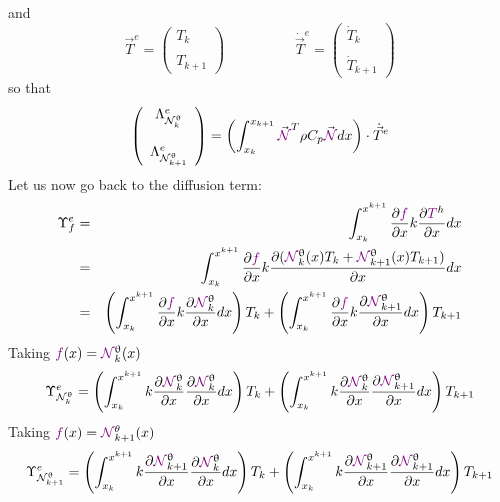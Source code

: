 and 
\[
{\vec T}^e = 
\left(
\begin{array}{c}
T_k \\ \\ T_{k+1}
\end{array}
\right)
\quad
\quad
\quad
\quad
\quad
\dot{\vec T}^e = 
\left(
\begin{array}{c}
\dot{T}_k \\ \\ \dot{T}_{k+1}
\end{array}
\right)
\]
so that 
\[
\left(
\begin{array}{c}
{\Lambda}_{{\mathcal{N}}_k^\uptheta}^e \\  \\ 
{\Lambda}_{{\mathcal{N}}_{k+1}^\uptheta}^e
\end{array}
\right)
=
\left( \int_{x_k}^{x_{k+1}}   
{\vec {\color{violet}{\mathcal{N}}}}^T \rho C_p  {\vec {\color{violet}{\mathcal{N}}}} dx  \right) \cdot \dot{\vec T}^e
\]
Let us now go back to the diffusion term:
\begin{eqnarray}
{\Upsilon}_f^e &=&
\int_{x_k}^{x^{k+1}} \frac{\partial {\color{violet}f}}{\partial x} k 
\frac{\partial {\color{violet}T}^h}{\partial x} dx \nonumber\\
&=&
\int_{x_k}^{x^{k+1}} \frac{\partial {\color{violet}f}}{\partial x} k \frac{\partial  
({\color{violet}{\mathcal{N}}}_{k}^\uptheta(x) T_k 
+ {\color{violet}{\mathcal{N}}}_{k+1}^\uptheta(x) T_{k+1} ) }{\partial x} dx  \nonumber\\
&=&
\left( \int_{x_k}^{x^{k+1}} \frac{\partial {\color{violet}f}}{\partial x}  
k \frac{\partial  {\color{violet}{\mathcal{N}}}_{k}^\uptheta } {\partial x}  dx \right)  T_k 
+ \left( \int_{x_k}^{x^{k+1}} \frac{\partial {\color{violet}f}}{\partial x}  
k \frac{\partial  {\color{violet}{\mathcal{N}}}_{k+1}^\uptheta } {\partial x} dx \right) T_{k+1}  \nonumber
\end{eqnarray}
Taking ${\color{violet}f}(x)={\color{violet}{\mathcal{N}}}_k^\uptheta(x)$ 
\[
{\Upsilon}_{{\mathcal{N}}_k^\uptheta}^e=
\left( \int_{x_k}^{x^{k+1}} k\frac{\partial {\color{violet}{\mathcal{N}}}_k^\uptheta}{\partial x}  
\frac{\partial  {\color{violet}{\mathcal{N}}}_{k}^\uptheta } {\partial x}  dx \right)  T_k 
+ \left( \int_{x_k}^{x^{k+1}} k\frac{\partial {\color{violet}{\mathcal{N}}}_k^\uptheta}{\partial x}  
\frac{\partial  {\color{violet}{\mathcal{N}}}_{k+1}^\uptheta } {\partial x} dx \right) T_{k+1}  \nonumber
\]
Taking ${\color{violet}f}(x)={\color{violet}{\mathcal{N}}}_{k+1}^\theta(x)$ 
\[
{\Upsilon}_{{\mathcal{N}}_{k+1}^\uptheta}^e=
\left( \int_{x_k}^{x^{k+1}} k\frac{\partial {\color{violet}{\mathcal{N}}}_{k+1}^\uptheta}{\partial x}  
\frac{\partial  {\color{violet}{\mathcal{N}}}_{k}^\uptheta } {\partial x}  dx \right)  T_k 
+ 
\left( \int_{x_k}^{x^{k+1}} k\frac{\partial {\color{violet}{\mathcal{N}}}_{k+1}^\uptheta}{\partial x}  
\frac{\partial  {\color{violet}{\mathcal{N}}}_{k+1}^\uptheta } {\partial x} dx \right) T_{k+1}  \nonumber
\]


